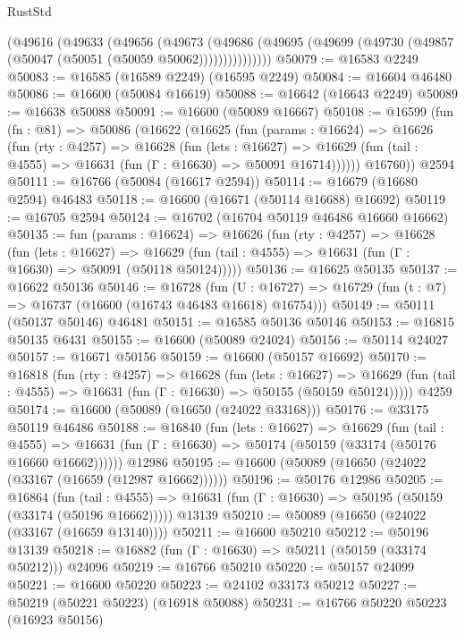 \begin{lexlean}{RustStd}
\begin{coremodule}
          (@49616
            (@49633
              (@49656
                (@49673
                  (@49686
                    (@49695 (@49699 (@49730 (@49857 (@50047 (@50051 (@50059 @50062)))))))))))))))
@50079 := @16583 @2249
@50083 := @16585 (@16589 @2249) (@16595 @2249)
@50084 := @16604 @46480
@50086 := @16600 (@50084 @16619)
@50088 := @16642 (@16643 @2249)
@50089 := @16638 @50088
@50091 := @16600 (@50089 @16667)
@50108 := @16599
    (fun (fn : @81) =>
    @50086
      (@16622
        (@16625
          (fun (params : @16624) =>
          @16626
            (fun (rty : @4257) =>
            @16628
              (fun (lets : @16627) =>
              @16629 (fun (tail : @4555) => @16631 (fun (Γ : @16630) => @50091 @16714))))))
        @16760))
    @2594
@50111 := @16766 (@50084 (@16617 @2594))
@50114 := @16679 (@16680 @2594) @46483
@50118 := @16600 (@16671 (@50114 @16688) @16692)
@50119 := @16705 @2594
@50124 := @16702 (@16704 @50119 @46486 @16660 @16662)
@50135 := fun (params : @16624) =>
  @16626
    (fun (rty : @4257) =>
    @16628
      (fun (lets : @16627) =>
      @16629 (fun (tail : @4555) => @16631 (fun (Γ : @16630) => @50091 (@50118 @50124)))))
@50136 := @16625 @50135
@50137 := @16622 @50136
@50146 := @16728
    (fun (U : @16727) => @16729 (fun (t : @7) => @16737 (@16600 (@16743 @46483 @16618) @16754)))
@50149 := @50111 (@50137 @50146) @46481
@50151 := @16585 @50136 @50146
@50153 := @16815 @50135 @6431
@50155 := @16600 (@50089 @24024)
@50156 := @50114 @24027
@50157 := @16671 @50156
@50159 := @16600 (@50157 @16692)
@50170 := @16818
    (fun (rty : @4257) =>
    @16628
      (fun (lets : @16627) =>
      @16629 (fun (tail : @4555) => @16631 (fun (Γ : @16630) => @50155 (@50159 @50124)))))
    @4259
@50174 := @16600 (@50089 (@16650 (@24022 @33168)))
@50176 := @33175 @50119 @46486
@50188 := @16840
    (fun (lets : @16627) =>
    @16629
      (fun (tail : @4555) =>
      @16631 (fun (Γ : @16630) => @50174 (@50159 (@33174 (@50176 @16660 @16662))))))
    @12986
@50195 := @16600 (@50089 (@16650 (@24022 (@33167 (@16659 (@12987 @16662))))))
@50196 := @50176 @12986
@50205 := @16864
    (fun (tail : @4555) => @16631 (fun (Γ : @16630) => @50195 (@50159 (@33174 (@50196 @16662)))))
    @13139
@50210 := @50089 (@16650 (@24022 (@33167 (@16659 @13140))))
@50211 := @16600 @50210
@50212 := @50196 @13139
@50218 := @16882 (fun (Γ : @16630) => @50211 (@50159 (@33174 @50212))) @24096
@50219 := @16766 @50210
@50220 := @50157 @24099
@50221 := @16600 @50220
@50223 := @24102 @33173 @50212
@50227 := @50219 (@50221 @50223) (@16918 @50088)
@50231 := @16766 @50220 @50223 (@16923 @50156)

\end{coremodule}
\end{lexlean}
